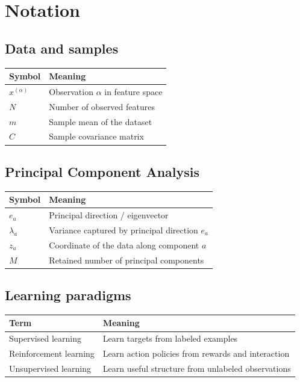\chapter*{Notation}

\section*{Data and samples}

\begin{tabular}{@{}ll@{}}
  \toprule
  \textbf{Symbol} & \textbf{Meaning} \\
  \midrule
  $x^{(\alpha)}$ & Observation $\alpha$ in feature space \\
  $N$ & Number of observed features \\
  $m$ & Sample mean of the dataset \\
  $C$ & Sample covariance matrix \\
  \bottomrule
\end{tabular}

\section*{Principal Component Analysis}

\begin{tabular}{@{}ll@{}}
  \toprule
  \textbf{Symbol} & \textbf{Meaning} \\
  \midrule
  $e_a$ & Principal direction / eigenvector \\
  $\lambda_a$ & Variance captured by principal direction $e_a$ \\
  $z_a$ & Coordinate of the data along component $a$ \\
  $M$ & Retained number of principal components \\
  \bottomrule
\end{tabular}

\section*{Learning paradigms}

\begin{tabular}{@{}ll@{}}
  \toprule
  \textbf{Term} & \textbf{Meaning} \\
  \midrule
  Supervised learning & Learn targets from labeled examples \\
  Reinforcement learning & Learn action policies from rewards and interaction \\
  Unsupervised learning & Learn useful structure from unlabeled observations \\
  \bottomrule
\end{tabular}
